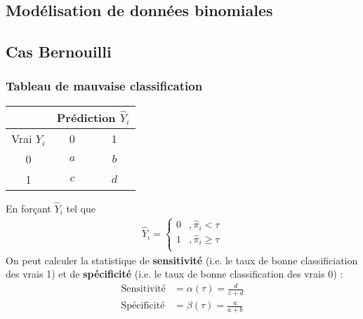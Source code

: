 \documentclass[10pt, french]{article}
\begin{document}
\begin{multicols*}{3}
\section{Modélisation de données binomiales}





\subsection{Cas Bernouilli}

\subsubsection*{Tableau de mauvaise classification}
\begin{center}
\begin{tabular}{|c|c|c|}
\hline
  & \multicolumn{2}{c|}{Prédiction $\hat{Y}_i$} \\ \hline
Vrai $Y_i$ & 0 & 1 \\ 
  \hline
0 & $a$ & $b$ \\ 
  1 & $c$ & $d$ \\ 
   \hline
\end{tabular}
\end{center}
En forçant $\hat{Y}_i$ tel que
\begin{align*}
\hat{Y}_i = 
\begin{cases}
0	& , \hat{\pi}_i < \tau \\
1	& , \hat{\pi}_i \geq \tau \\
\end{cases}
\end{align*}
On peut calculer la statistique de \textbf{sensitivité} (i.e. le taux de bonne classificiation des vrais 1) et de \textbf{spécificité} (i.e. le taux de bonne classification des vrais 0) : 
\begin{align*}
\text{Sensitivité}	& = \alpha(\tau) = \frac{d}{c+d} \\
\text{Spécificité}	& = \beta(\tau) = \frac{a}{a+b} \\
\end{align*}






\end{multicols*}
\end{document}
